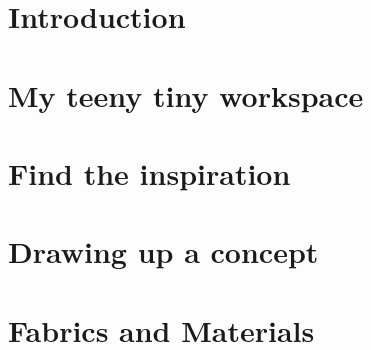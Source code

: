 \chapter{Introduction} \label{chap:intro}


\chapter{My teeny tiny workspace} \label{chap:workspace}


\chapter{Find the inspiration} \label{chap:inspiration}


\chapter{Drawing up a concept} \label{chap:drawing}


\chapter{Fabrics and Materials} \label{chap:materials}

